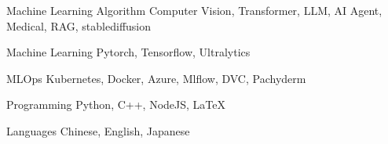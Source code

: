 

\begin{cvskills}

  \cvskill
    {Machine Learning Algorithm} %
    {Computer Vision, Transformer, LLM, AI Agent, Medical, RAG, stablediffusion} %

  \cvskill
    {Machine Learning} %
    {Pytorch, Tensorflow, Ultralytics} %

  \cvskill
  {MLOps} %
  {Kubernetes, Docker, Azure, Mlflow, DVC, Pachyderm} %

\cvskill
  {Programming} %
  {Python, C++, NodeJS, LaTeX} %

  \cvskill
    {Languages} %
    {Chinese, English, Japanese} %

\end{cvskills}
